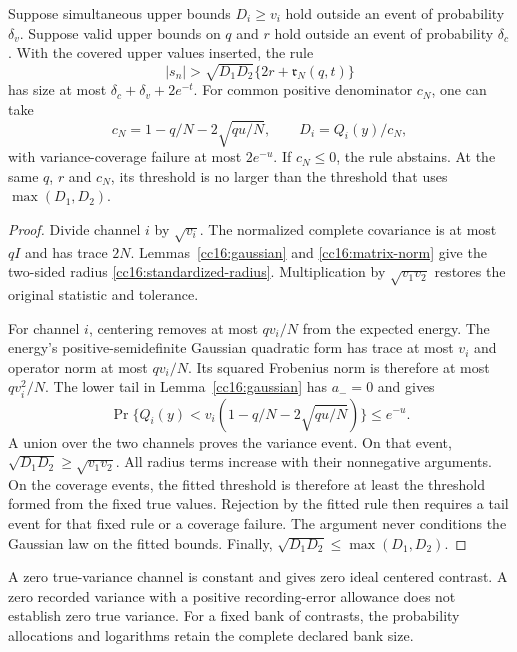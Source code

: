 \begin{theorem}
\label{cc16:geometric}
Suppose simultaneous upper bounds $D_i\ge v_i$ hold outside an event of probability $\delta_v$. Suppose valid upper bounds on $q$ and $r$ hold outside an event of probability $\delta_c$. With the covered upper values inserted, the rule
\begin{equation}
 |s_n|>\sqrt{D_1D_2}\{2r+\mathfrak r_N(q,t)\}
 \label{cc16:geometric-rule}
\end{equation}
has size at most $\delta_c+\delta_v+2e^{-t}$. For common positive denominator $c_N$, one can take
\begin{equation}
 c_N=1-q/N-2\sqrt{qu/N},\qquad
 D_i=Q_i(y)/c_N,
 \label{cc16:variance-ceilings}
\end{equation}
with variance-coverage failure at most $2e^{-u}$. If $c_N\le0$, the rule abstains. At the same $q$, $r$ and $c_N$, its threshold is no larger than the threshold that uses $\max(D_1,D_2)$.
\end{theorem}
\begin{proof}
Divide channel $i$ by $\sqrt{v_i}$. The normalized complete covariance is at most $qI$ and has trace $2N$. Lemmas~\ref{cc16:gaussian} and \ref{cc16:matrix-norm} give the two-sided radius \eqref{cc16:standardized-radius}. Multiplication by $\sqrt{v_1v_2}$ restores the original statistic and tolerance.

For channel $i$, centering removes at most $qv_i/N$ from the expected energy. The energy's positive-semidefinite Gaussian quadratic form has trace at most $v_i$ and operator norm at most $qv_i/N$. Its squared Frobenius norm is therefore at most $qv_i^2/N$. The lower tail in Lemma~\ref{cc16:gaussian} has $a_-=0$ and gives
\[
 \Pr\{Q_i(y)<v_i(1-q/N-2\sqrt{qu/N})\}\le e^{-u}.
\]
A union over the two channels proves the variance event. On that event, $\sqrt{D_1D_2}\ge\sqrt{v_1v_2}$. All radius terms increase with their nonnegative arguments. On the coverage events, the fitted threshold is therefore at least the threshold formed from the fixed true values. Rejection by the fitted rule then requires a tail event for that fixed rule or a coverage failure. The argument never conditions the Gaussian law on the fitted bounds. Finally, $\sqrt{D_1D_2}\le\max(D_1,D_2)$.
\end{proof}

A zero true-variance channel is constant and gives zero ideal centered contrast. A zero recorded variance with a positive recording-error allowance does not establish zero true variance. For a fixed bank of contrasts, the probability allocations and logarithms retain the complete declared bank size.

